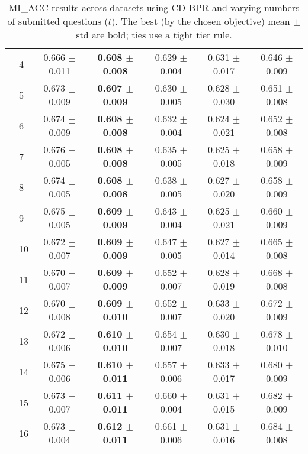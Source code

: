 \begin{table*}[t]
{\begin{tabular}{ll c c c c c}
        & 4 & 0.666 $\pm$ 0.011 & \textbf{0.608 $\pm$ 0.008} & 0.629 $\pm$ 0.004 & 0.631 $\pm$ 0.017 & 0.646 $\pm$ 0.009 \\
        & 5 & 0.673 $\pm$ 0.009 & \textbf{0.607 $\pm$ 0.009} & 0.630 $\pm$ 0.005 & 0.628 $\pm$ 0.030 & 0.651 $\pm$ 0.008 \\
        & 6 & 0.674 $\pm$ 0.009 & \textbf{0.608 $\pm$ 0.008} & 0.632 $\pm$ 0.004 & 0.624 $\pm$ 0.021 & 0.652 $\pm$ 0.008 \\
        & 7 & 0.676 $\pm$ 0.005 & \textbf{0.608 $\pm$ 0.008} & 0.635 $\pm$ 0.005 & 0.625 $\pm$ 0.018 & 0.658 $\pm$ 0.009 \\
        & 8 & 0.674 $\pm$ 0.005 & \textbf{0.608 $\pm$ 0.008} & 0.638 $\pm$ 0.005 & 0.627 $\pm$ 0.020 & 0.658 $\pm$ 0.009 \\
        & 9 & 0.675 $\pm$ 0.005 & \textbf{0.609 $\pm$ 0.009} & 0.643 $\pm$ 0.004 & 0.625 $\pm$ 0.021 & 0.660 $\pm$ 0.009 \\
        & 10 & 0.672 $\pm$ 0.007 & \textbf{0.609 $\pm$ 0.009} & 0.647 $\pm$ 0.005 & 0.627 $\pm$ 0.014 & 0.665 $\pm$ 0.008 \\
        & 11 & 0.670 $\pm$ 0.007 & \textbf{0.609 $\pm$ 0.009} & 0.652 $\pm$ 0.007 & 0.628 $\pm$ 0.019 & 0.668 $\pm$ 0.008 \\
        & 12 & 0.670 $\pm$ 0.008 & \textbf{0.609 $\pm$ 0.010} & 0.652 $\pm$ 0.007 & 0.633 $\pm$ 0.020 & 0.672 $\pm$ 0.009 \\
        & 13 & 0.672 $\pm$ 0.006 & \textbf{0.610 $\pm$ 0.010} & 0.654 $\pm$ 0.007 & 0.630 $\pm$ 0.018 & 0.678 $\pm$ 0.010 \\
        & 14 & 0.675 $\pm$ 0.006 & \textbf{0.610 $\pm$ 0.011} & 0.657 $\pm$ 0.006 & 0.633 $\pm$ 0.017 & 0.680 $\pm$ 0.009 \\
        & 15 & 0.673 $\pm$ 0.007 & \textbf{0.611 $\pm$ 0.011} & 0.660 $\pm$ 0.004 & 0.631 $\pm$ 0.015 & 0.682 $\pm$ 0.009 \\
        & 16 & 0.673 $\pm$ 0.004 & \textbf{0.612 $\pm$ 0.011} & 0.661 $\pm$ 0.006 & 0.631 $\pm$ 0.016 & 0.684 $\pm$ 0.008 \\
\bottomrule
\end{tabular}
}
\caption{MI_ACC results across datasets using CD-BPR and varying numbers of submitted questions ($t$). The best (by the chosen objective) mean $\pm$ std are bold; ties use a tight tier rule.}
\label{tab:results-mi_acc-cd-bpr}
\end{table*}

